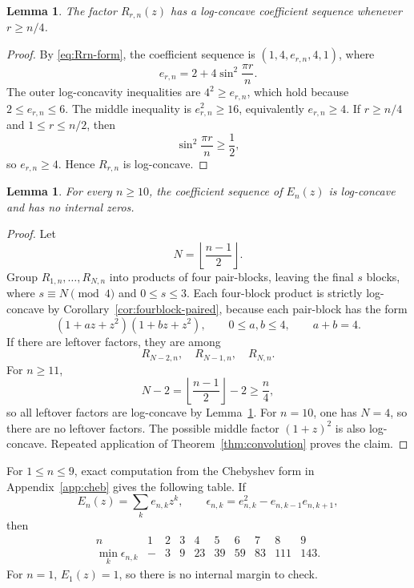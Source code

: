 \documentclass[11pt]{amsart}
\newtheorem{lemma}[theorem]{Lemma}
\begin{document}
\begin{lemma}\label{lem:even-pair-LC}
The factor \(R_{r,n}(z)\) has a log-concave coefficient sequence whenever \(r\ge n/4\).
\end{lemma}

\begin{proof}
By \eqref{eq:Rrn-form}, the coefficient sequence is \((1,4,e_{r,n},4,1)\), where
\[
        e_{r,n}=2+4\sin^2\frac{\pi r}{n}.
\]
The outer log-concavity inequalities are \(4^2\ge e_{r,n}\), which hold because \(2\le e_{r,n}\le6\).  The middle inequality is \(e_{r,n}^2\ge16\), equivalently \(e_{r,n}\ge4\).  If \(r\ge n/4\) and \(1\le r\le n/2\), then
\[
        \sin^2\frac{\pi r}{n}\ge\frac12,
\]
so \(e_{r,n}\ge4\).  Hence \(R_{r,n}\) is log-concave.
\end{proof}

\begin{lemma}\label{lem:En-large}
For every \(n\ge10\), the coefficient sequence of \(E_n(z)\) is log-concave and has no internal zeros.
\end{lemma}

\begin{proof}
Let
\[
        N=\left\lfloor\frac{n-1}{2}\right\rfloor.
\]
Group \(R_{1,n},\ldots,R_{N,n}\) into products of four pair-blocks, leaving the final \(s\) blocks, where \(s\equiv N\pmod4\) and \(0\le s\le3\).  Each four-block product is strictly log-concave by Corollary~\ref{cor:fourblock-paired}, because each pair-block has the form
\[
        (1+az+z^2)(1+bz+z^2),
        \qquad
        0\le a,b\le4,
        \qquad a+b=4.
\]
If there are leftover factors, they are among
\[
        R_{N-2,n},\quad R_{N-1,n},\quad R_{N,n}.
\]
For \(n\ge11\),
\[
        N-2=\left\lfloor\frac{n-1}{2}\right\rfloor-2\ge\frac n4,
\]
so all leftover factors are log-concave by Lemma~\ref{lem:even-pair-LC}.  For \(n=10\), one has \(N=4\), so there are no leftover factors.  The possible middle factor \((1+z)^2\) is also log-concave.  Repeated application of Theorem~\ref{thm:convolution} proves the claim.
\end{proof}

For \(1\le n\le9\), exact computation from the Chebyshev form in Appendix~\ref{app:cheb} gives the following table.  If
\[
        E_n(z)=\sum_k e_{n,k}z^k,
        \qquad
        \epsilon_{n,k}=e_{n,k}^2-e_{n,k-1}e_{n,k+1},
\]
then
\[
\begin{array}{c|ccccccccc}
 n&1&2&3&4&5&6&7&8&9\\
\hline
 \min_k\epsilon_{n,k}
 &-&3&9&23&39&59&83&111&143.
\end{array}
\]
For \(n=1\), \(E_1(z)=1\), so there is no internal margin to check.
\end{document}
